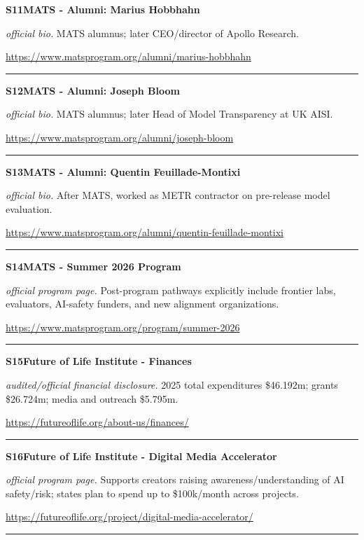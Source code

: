 \hypertarget{src:S11}{}\noindent\textbf{S11}\quad \textbf{MATS - Alumni: Marius Hobbhahn}\hfill{}\par
\smallskip
\noindent\textit{official bio.} MATS alumnus; later CEO/director of Apollo Research.\par
\noindent\url{https://www.matsprogram.org/alumni/marius-hobbhahn}\par
\medskip\hrule\medskip

\hypertarget{src:S12}{}\noindent\textbf{S12}\quad \textbf{MATS - Alumni: Joseph Bloom}\hfill{}\par
\smallskip
\noindent\textit{official bio.} MATS alumnus; later Head of Model Transparency at UK AISI.\par
\noindent\url{https://www.matsprogram.org/alumni/joseph-bloom}\par
\medskip\hrule\medskip

\hypertarget{src:S13}{}\noindent\textbf{S13}\quad \textbf{MATS - Alumni: Quentin Feuillade-Montixi}\hfill{}\par
\smallskip
\noindent\textit{official bio.} After MATS, worked as METR contractor on pre-release model evaluation.\par
\noindent\url{https://www.matsprogram.org/alumni/quentin-feuillade-montixi}\par
\medskip\hrule\medskip

\hypertarget{src:S14}{}\noindent\textbf{S14}\quad \textbf{MATS - Summer 2026 Program}\hfill{}\par
\smallskip
\noindent\textit{official program page.} Post-program pathways explicitly include frontier labs, evaluators, AI-safety funders, and new alignment organizations.\par
\noindent\url{https://www.matsprogram.org/program/summer-2026}\par
\medskip\hrule\medskip

\hypertarget{src:S15}{}\noindent\textbf{S15}\quad \textbf{Future of Life Institute - Finances}\hfill{}\par
\smallskip
\noindent\textit{audited/official financial disclosure.} 2025 total expenditures \$46.192m; grants \$26.724m; media and outreach \$5.795m.\par
\noindent\url{https://futureoflife.org/about-us/finances/}\par
\medskip\hrule\medskip

\hypertarget{src:S16}{}\noindent\textbf{S16}\quad \textbf{Future of Life Institute - Digital Media Accelerator}\hfill{}\par
\smallskip
\noindent\textit{official program page.} Supports creators raising awareness/understanding of AI safety/risk; states plan to spend up to \$100k/month across projects.\par
\noindent\url{https://futureoflife.org/project/digital-media-accelerator/}\par
\medskip\hrule\medskip

